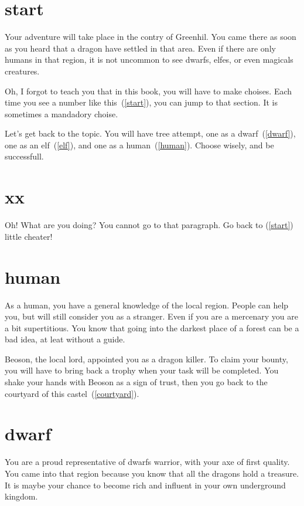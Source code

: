 \section{start}

Your adventure will take place in the contry of Greenhil. You came there as soon
as you heard that a dragon have settled in that area. Even if there are only
humans in that region, it is not uncommon to see dwarfs, elfes, or even magicals
creatures.

Oh, I forgot to teach you that in this book, you will have to make choises. Each
time you see a number like this~(\ref{start}), you can jump to that section.
It is sometimes a mandadory choise.

Let's get back to the topic. You will have tree attempt, one as a
dwarf~(\ref{dwarf}), one as an elf~(\ref{elf}), and one as a
human~(\ref{human}). Choose wisely, and be successfull.

\section{xx}

Oh! What are you doing? You cannot go to that paragraph. Go back to
(\ref{start}) little cheater!

\section{human}

As a human, you have a general knowledge of the local region. People can help
you, but will still consider you as a stranger. Even if you are a mercenary you
are a bit supertitious. You know that going into the darkest place of a forest
can be a bad idea, at leat without a guide.

Beoson, the local lord, appointed you as a dragon killer. To claim your bounty,
you will have to bring back a trophy when your task will be completed. You shake
your hands with Beoson as a sign of trust, then you go back to the courtyard of this
castel~(\ref{courtyard}).

\section{dwarf}

You are a proud representative of dwarfs warrior, with your axe of first
quality. You came into that region because you know that all the dragons hold a
treasure. It is maybe your chance to become rich and influent in your own
underground kingdom.

